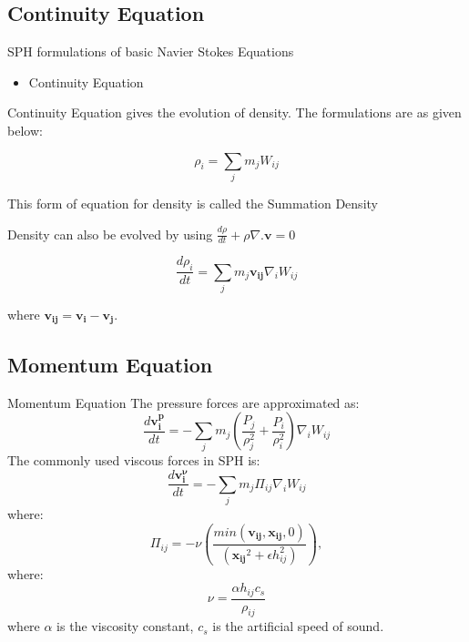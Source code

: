 \documentclass{beamer}
\begin{document}
\subsection{Continuity Equation}
\begin{frame}{SPH formulations of basic Navier Stokes Equations}
\begin{itemize}
\item Continuity Equation
\end{itemize}
Continuity Equation gives the evolution of density. The formulations
are as given below:

\begin{equation*}
 \rho_i = \sum_j m_j W_{ij}
 \label{summation}
\end{equation*}

This form of equation for density is called the Summation Density

\noindent
Density can also be evolved by using $\frac{d\rho}{dt} + \rho \nabla . \mathbf{v} = 0$

\begin{equation*}
 \frac{d\rho_i}{dt} = \sum_j m_j \mathbf{v_{ij}} \nabla_i W_{ij}
  \label{Continuity}
 \end{equation*}

where $\mathbf{v_{ij}} = \mathbf{v_i} - \mathbf{v_j}$.\\
\end{frame}

\subsection{Momentum Equation}
\begin{frame}{Momentum Equation}
The pressure forces are approximated as:
\begin{equation*}
 \frac{d\mathbf{v_i^p}}{dt} = -\sum_j m_j \left( \frac{P_j}{\rho_j^2} + \frac{P_i}{\rho_i^2}\right)\nabla_i W_{ij}
\end{equation*}
The commonly used viscous forces in SPH is:
\begin{equation*}
 \frac{d\mathbf{v_i^\nu}}{dt} = - \sum_j m_j \Pi_{ij} \nabla_i W_{ij}
\end{equation*}
where:
\begin{equation*}
 \Pi_{ij} = -\nu \left( \frac{min(\mathbf{v_{ij}}, \mathbf{x_{ij}}, 0)}{(\mathbf{x_{ij}}^2 + \epsilon h_{ij}^2)}\right), 
  \label{pi}
 \end{equation*}
where:
\begin{equation*}
 \nu = \frac{\alpha h_{ij}c_s}{\rho_{ij}}
\end{equation*}
where $\alpha$ is the viscosity constant, $c_s$ is the artificial speed of sound.
\end{frame}
\end{document}
